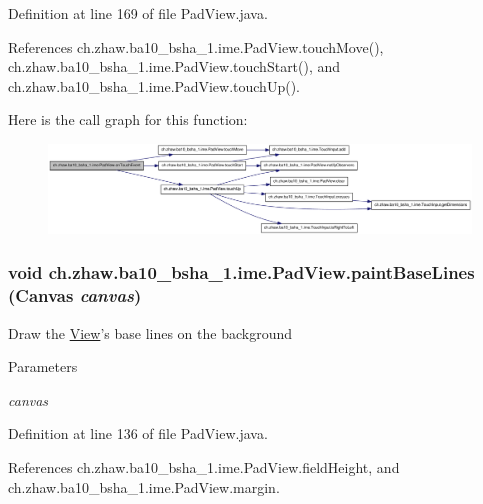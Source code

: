 Definition at line 169 of file PadView.java.

References ch.zhaw.ba10\_\-bsha\_\-1.ime.PadView.touchMove(), ch.zhaw.ba10\_\-bsha\_\-1.ime.PadView.touchStart(), and ch.zhaw.ba10\_\-bsha\_\-1.ime.PadView.touchUp().

Here is the call graph for this function:\nopagebreak
\begin{figure}[H]
\begin{center}
\leavevmode
\includegraphics[width=420pt]{classch_1_1zhaw_1_1ba10__bsha__1_1_1ime_1_1PadView_ac9247d50f73d59730a5893447aa8ca46_cgraph}
\end{center}
\end{figure}
\hypertarget{classch_1_1zhaw_1_1ba10__bsha__1_1_1ime_1_1PadView_a86b554f6a4a5fe0023b2c8bac23e32c7}{
\subsubsection[{paintBaseLines}]{\setlength{\rightskip}{0pt plus 5cm}void ch.zhaw.ba10\_\-bsha\_\-1.ime.PadView.paintBaseLines (Canvas {\em canvas})}}
\label{classch_1_1zhaw_1_1ba10__bsha__1_1_1ime_1_1PadView_a86b554f6a4a5fe0023b2c8bac23e32c7}
Draw the \hyperlink{}{View}'s base lines on the background


\begin{DoxyParams}{Parameters}
\item[{\em canvas}]\end{DoxyParams}


Definition at line 136 of file PadView.java.

References ch.zhaw.ba10\_\-bsha\_\-1.ime.PadView.fieldHeight, and ch.zhaw.ba10\_\-bsha\_\-1.ime.PadView.margin.

